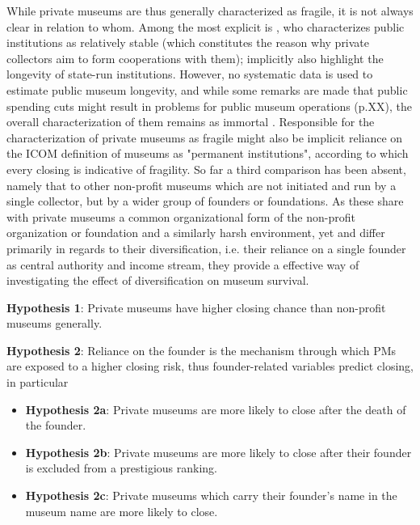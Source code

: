 \documentclass[12pt]{article}
\begin{document}
While private museums are thus generally characterized as fragile, it is not always clear in relation to whom.
Among the most explicit is \textcite{Walker_2019_collector}, who characterizes public institutions as relatively stable (which constitutes the reason why private collectors aim to form cooperations with them); \textcite{Bechtler_Imhof_2018_future} implicitly also highlight the longevity of state-run institutions.
However, no systematic data is used to estimate public museum longevity, and while some
remarks are made that public spending cuts might result in problems for public museum operations (p.XX), the overall characterization of them remains as immortal \parencite{Frey_Meier_2002_beyeler}.
Responsible for the characterization of private museums as fragile might also be implicit reliance on the ICOM definition \parencite{ICOM_2024_definition} of museums as "permanent institutions", according to which every closing is indicative of fragility.
So far a third comparison has been absent, namely that to other non-profit museums which are not initiated and run by a single collector, but by a wider group of founders or foundations.
As these share with private museums a common organizational form of the non-profit organization or foundation  and a similarly harsh environment, yet and differ primarily in regards to their diversification, i.e. their reliance on a single founder as central authority and income stream, they provide a effective way of investigating the effect of diversification on museum survival. 


\textbf{Hypothesis 1}: Private museums have higher closing chance than non-profit museums generally.

\textbf{Hypothesis 2}: Reliance on the founder is the mechanism through which PMs are exposed to a higher closing risk, thus founder-related variables predict closing, in particular
\begin{itemize}
\item \textbf{Hypothesis 2a}: Private museums are more likely to close after the death of the founder.
\item \textbf{Hypothesis 2b}: Private museums are more likely to close after their founder is excluded from a prestigious ranking.
\item \textbf{Hypothesis 2c}: Private museums which carry their founder's name in the museum name are more likely to close.
\end{itemize}
\end{document}
